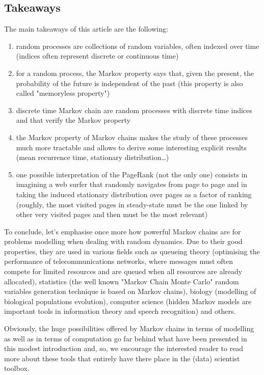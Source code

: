 \subsection{Takeaways}

The main takeaways of this article are the following:
\begin{enumerate}

\item random processes are collections of random variables, often indexed over time (indices often represent discrete or continuous time)

\item for a random process, the Markov property says that, given the present, the probability of the future is independent of the past (this property is also called "memoryless property")

\item discrete time Markov chain are random processes with discrete time indices and that verify the Markov property

\item the Markov property of Markov chains makes the study of these processes much more tractable and allows to derive some interesting explicit results (mean recurrence time, stationary distribution…)

\item one possible interpretation of the PageRank (not the only one) consists in imagining a web surfer that randomly navigates from page to page and in taking the induced stationary distribution over pages as a factor of ranking (roughly, the most visited pages in steady-state must be the one linked by other very visited pages and then must be the most relevant)
\end{enumerate}

To conclude, let's emphasise once more how powerful Markov chains are for problems modelling when dealing with random dynamics. Due to their good properties, they are used in various fields such as queueing theory \cite{willig1999} (optimising the performance of telecommunications networks, where messages must often compete for limited resources and are queued when all resources are already allocated), statistics (the well known "Markov Chain Monte Carlo" \cite{JosephRoccaBayes2019} random variables generation technique is based on Markov chains), biology (modelling of biological populations evolution), computer science (hidden Markov models \cite{Rabiner1986,Rabiner1989,stamp2018} are important tools in information theory and speech recognition) and others.

Obviously, the huge possibilities offered by Markov chains in terms of modelling as well as in terms of computation go far behind what have been presented in this modest introduction and, so, we encourage the interested reader to read more about these tools that entirely have there place in the (data) scientist toolbox.

